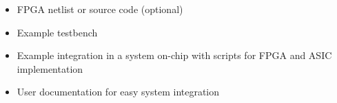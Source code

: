 \begin{itemize}
\item FPGA netlist or source code (optional)
\item Example testbench
\item Example integration in a system on-chip with scripts for FPGA and ASIC implementation
\item User documentation for easy system integration
\end{itemize}
